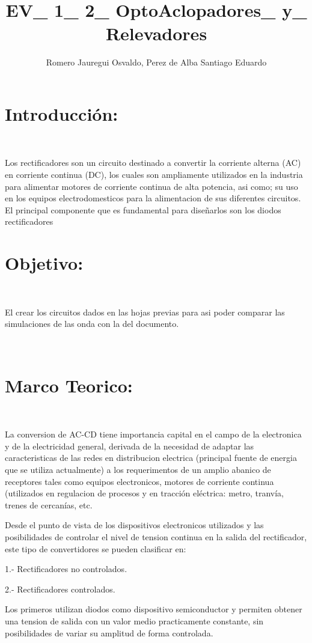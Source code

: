 \documentclass[12pt,letterpaper]{article}
\title{EV\_ 1\_ 2\_ OptoAclopadores\_ y\_ Relevadores  }
\author{Romero Jauregui Osvaldo, Perez de Alba Santiago Eduardo}
\begin{document}
\maketitle

\section{Introducción:}
\

Los rectificadores son un circuito destinado a convertir la corriente alterna (AC) en corriente continua (DC), los cuales son ampliamente utilizados en la industria para alimentar motores de corriente continua de alta potencia, asi como; su uso en los equipos electrodomesticos para la alimentacion de sus diferentes circuitos. El principal componente que es fundamental para diseñarlos son los diodos rectificadores
\

\section{Objetivo:}
\

El crear los circuitos dados en las hojas previas para asi poder comparar las simulaciones de las onda con la del documento.

\

\section{Marco Teorico:}
\

La conversion de AC-CD tiene importancia capital en el campo de la electronica y de la electricidad general, derivada de la necesidad de adaptar las caracteristicas de las redes en distribucion electrica (principal fuente de energia que se utiliza actualmente) a los requerimentos de un amplio abanico de receptores tales como equipos electronicos, motores de corriente continua (utilizados en regulacion de procesos y en tracción  eléctrica: metro, tranvía, trenes de cercanías, etc.
\

Desde el punto de vista de los dispositivos electronicos utilizados y las posibilidades de controlar el nivel de tension continua en la salida del rectificador, este tipo de convertidores se pueden clasificar en:
\

1.- Rectificadores no controlados.
\

2.- Rectificadores controlados.
\

Los primeros utilizan diodos como dispositivo semiconductor y permiten obtener una tension de salida con un valor medio practicamente constante, sin posibilidades de variar su amplitud de forma controlada.
\
\end{document}
